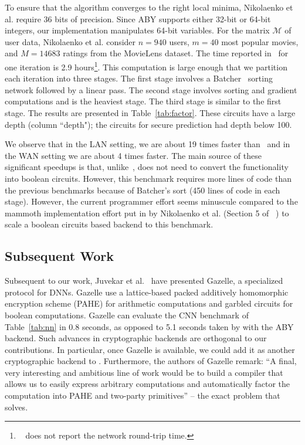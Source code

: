 To ensure that the algorithm converges to the right local minima, Nikolaenko et al. require
36 bits of precision. Since ABY supports either 32-bit or 64-bit integers, our \tool implementation
manipulates 64-bit variables. For the matrix $\mathcal{M}$ of  user data, Nikolaenko et al. consider $n=940$ users, $m=40$ most popular movies, and $M=14683$ ratings from the MovieLens dataset. The time reported in~\cite{valeriaMatrix}
for one iteration is 2.9 hours\footnote{~\cite{valeriaMatrix} does not report the network round-trip time.}. This computation is large enough that we partition each iteration
into three stages. The first stage involves a Batcher~\cite{Batcher} sorting network followed by a linear pass.
The second stage involves sorting and gradient computations and is the heaviest stage.
The third  stage is similar to the first stage. The results are presented in Table~\ref{tab:factor}. These circuits have a large depth (column ``depth"); the circuits for secure prediction had depth below 100.


We observe that in the LAN setting, we are about 19 times faster than~\cite{valeriaMatrix} and in the WAN
setting we are about 4 times faster. The main source of these significant speedups is that, unlike~\cite{valeriaMatrix}, \tool does not need to convert the functionality into boolean circuits. 
However, this benchmark requires more lines of code than the previous benchmarks
because of  Batcher's sort (450 lines of \tool code in each stage).
However, the current programmer effort seems minuscule compared to the mammoth implementation effort
put in by Nikolaenko et al. (Section 5 of ~\cite{valeriaMatrix}) to scale a boolean circuits based
backend to this benchmark.

\subsection{Subsequent Work}
Subsequent to our work, Juvekar et al.~\cite{gazelle}  have
presented {\sc Gazelle}, a specialized protocol for DNNs.
{\sc Gazelle} use a lattice-based packed additively homomorphic
encryption scheme (PAHE) for arithmetic computations and garbled
circuits for boolean computations. {\sc Gazelle} can evaluate the CNN benchmark of
Table~\ref{tab:nn} in 0.8 seconds, as opposed to
5.1 seconds taken by \tool with the ABY backend. Such advances in
cryptographic backends are orthogonal to our contributions. In
particular, once {\sc Gazelle} is available, we could add it as another
cryptographic backend to \tool. Furthermore, the authors of {\sc Gazelle} remark:
``A final, very interesting and ambitious line
of work would be to build a compiler that allows us to easily
express arbitrary computations and automatically factor the
computation into PAHE and two-party primitives'' -- the exact problem
that \tool solves.



